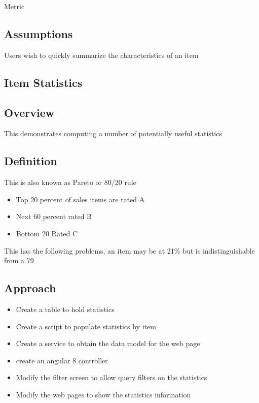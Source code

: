 \documentclass[letterpaper,10pt,english]{sphinxmanual}
\begin{document}
Metric


\subsection{Assumptions}
\label{\detokenize{100-ABC:assumptions}}
Users wish to quickly summarize the characteristics of an item


\subsection{Item Statistics}
\label{\detokenize{100-ABC:item-statistics}}

\subsection{Overview}
\label{\detokenize{100-ABC:overview}}
This demonstrates computing a number of potentially useful statistics


\subsection{Definition}
\label{\detokenize{100-ABC:definition}}
This is also known as Pareto or 80/20 rule

\begin{itemize}
\item {} 
Top 20 percent of sales items are rated A

\item {} 
Next 60 percent rated B

\item {} 
Bottom 20 Rated C

\end{itemize}

This has the following problems, an item may be at 21\% but is indistinguishable from a 79


\subsection{Approach}
\label{\detokenize{100-ABC:approach}}\begin{itemize}
\item {} 
Create a table to hold statistics

\item {} 
Create a script to populate statistics by item

\item {} 
Create a service to obtain the data model for the web page

\item {} 
create an angular 8 controller 

\item {} 
Modify the filter screen to allow query filters on the statistics

\item {} 
Modify the web pages to show the statistics information

\end{itemize}
\end{document}
